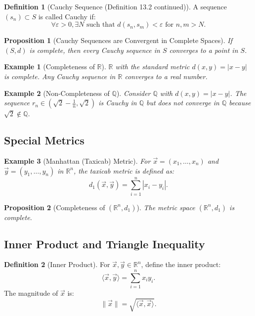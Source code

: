 \documentclass[9pt]{article}
\theoremstyle{definition}
\newtheorem{definition}{Definition}
\theoremstyle{plain}
\newtheorem{proposition}{Proposition}
\newtheorem{example}{Example}
\begin{document}
\begin{definition}[Cauchy Sequence (Definition 13.2 continued)]
A sequence \( (s_n) \subset S \) is called Cauchy if:
\[
\forall \varepsilon > 0, \exists N \text{ such that } d(s_n, s_m) < \varepsilon \text{ for } n, m > N.
\]
\end{definition}

\begin{proposition}[Cauchy Sequences are Convergent in Complete Spaces]
If \( (S, d) \) is complete, then every Cauchy sequence in \( S \) converges to a point in \( S \).
\end{proposition}

\begin{example}[Completeness of \( \mathbb{R} \)]
\( \mathbb{R} \) with the standard metric \( d(x, y) = |x - y| \) is complete. Any Cauchy sequence in \( \mathbb{R} \) converges to a real number.
\end{example}

\begin{example}[Non-Completeness of \( \mathbb{Q} \)]
Consider \( \mathbb{Q} \) with \( d(x, y) = |x - y| \). The sequence \( r_n \in (\sqrt{2} - \frac{1}{n}, \sqrt{2}) \) is Cauchy in \( \mathbb{Q} \) but does not converge in \( \mathbb{Q} \) because \( \sqrt{2} \notin \mathbb{Q} \).
\end{example}

\subsection*{Special Metrics}
\begin{example}[Manhattan (Taxicab) Metric]
For \( \vec{x} = (x_1, \ldots, x_n) \) and \( \vec{y} = (y_1, \ldots, y_n) \) in \( \mathbb{R}^n \), the taxicab metric is defined as:
\[
d_1(\vec{x}, \vec{y}) = \sum_{i=1}^n |x_i - y_i|.
\]
\end{example}

\begin{proposition}[Completeness of \( (\mathbb{R}^n, d_1) \)]
The metric space \( (\mathbb{R}^n, d_1) \) is complete.
\end{proposition}

\subsection*{Inner Product and Triangle Inequality}
\begin{definition}[Inner Product]
For \( \vec{x}, \vec{y} \in \mathbb{R}^n \), define the inner product:
\[
\langle \vec{x}, \vec{y} \rangle = \sum_{i=1}^n x_i y_i.
\]
The magnitude of \( \vec{x} \) is:
\[
\|\vec{x}\| = \sqrt{\langle \vec{x}, \vec{x} \rangle}.
\]
\end{definition}
\end{document}
